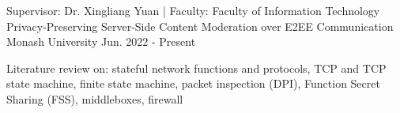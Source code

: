 

\begin{cventries}


   \cventry
   {Supervisor: Dr. Xingliang Yuan | Faculty: Faculty of Information Technology} %
   {Privacy-Preserving Server-Side Content Moderation over E2EE Communication} %
   {Monash University} %
   {Jun. 2022 - Present} %
   {
      \begin{cvitems} %
         \item {Literature review on: stateful network functions and protocols, TCP and TCP state machine, finite state machine, packet inspection (DPI), Function Secret Sharing (FSS), middleboxes, firewall}
      \end{cvitems}
   }

\end{cventries}
\vspace{-3.0mm}

